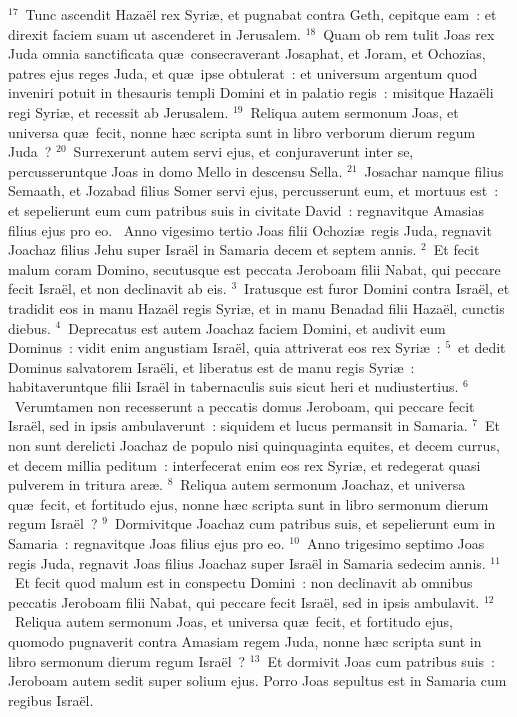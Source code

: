 ${}^{17}$~Tunc ascendit Haza\"el rex Syri\ae , et pugnabat contra Geth, cepitque eam~: et direxit faciem suam ut ascenderet in Jerusalem.
${}^{18}$~Quam ob rem tulit Joas rex Juda omnia sanctificata qu\ae\ consecraverant Josaphat, et Joram, et Ochozias, patres ejus reges Juda, et qu\ae\ ipse obtulerat~: et universum argentum quod inveniri potuit in thesauris templi Domini et in palatio regis~: misitque Haza\"eli regi Syri\ae , et recessit ab Jerusalem.
${}^{19}$~Reliqua autem sermonum Joas, et universa qu\ae\ fecit, nonne h\ae c scripta sunt in libro verborum dierum regum Juda~?
${}^{20}$~Surrexerunt autem servi ejus, et conjuraverunt inter se, percusseruntque Joas in domo Mello in descensu Sella.
${}^{21}$~Josachar namque filius Semaath, et Jozabad filius Somer servi ejus, percusserunt eum, et mortuus est~: et sepelierunt eum cum patribus suis in civitate David~: regnavitque Amasias filius ejus pro eo.
~\lettrine[lines=10,image=true,loversize=0.05,lraise=-0.03]{A}{}nno vigesimo tertio Joas filii Ochozi\ae\ regis Juda, regnavit Joachaz filius Jehu super Isra\"el in Samaria decem et septem annis.
${}^{2}$~Et fecit malum coram Domino, secutusque est peccata Jeroboam filii Nabat, qui peccare fecit Isra\"el, et non declinavit ab eis.
${}^{3}$~Iratusque est furor Domini contra Isra\"el, et tradidit eos in manu Haza\"el regis Syri\ae , et in manu Benadad filii Haza\"el, cunctis diebus.
${}^{4}$~Deprecatus est autem Joachaz faciem Domini, et audivit eum Dominus~: vidit enim angustiam Isra\"el, quia attriverat eos rex Syri\ae~:
${}^{5}$~et dedit Dominus salvatorem Isra\"eli, et liberatus est de manu regis Syri\ae~: habitaveruntque filii Isra\"el in tabernaculis suis sicut heri et nudiustertius.
${}^{6}$~Verumtamen non recesserunt a peccatis domus Jeroboam, qui peccare fecit Isra\"el, sed in ipsis ambulaverunt~: siquidem et lucus permansit in Samaria.
${}^{7}$~Et non sunt derelicti Joachaz de populo nisi quinquaginta equites, et decem currus, et decem millia peditum~: interfecerat enim eos rex Syri\ae , et redegerat quasi pulverem in tritura are\ae .
${}^{8}$~Reliqua autem sermonum Joachaz, et universa qu\ae\ fecit, et fortitudo ejus, nonne h\ae c scripta sunt in libro sermonum dierum regum Isra\"el~?
${}^{9}$~Dormivitque Joachaz cum patribus suis, et sepelierunt eum in Samaria~: regnavitque Joas filius ejus pro eo.
${}^{10}$~Anno trigesimo septimo Joas regis Juda, regnavit Joas filius Joachaz super Isra\"el in Samaria sedecim annis.
${}^{11}$~Et fecit quod malum est in conspectu Domini~: non declinavit ab omnibus peccatis Jeroboam filii Nabat, qui peccare fecit Isra\"el, sed in ipsis ambulavit.
${}^{12}$~Reliqua autem sermonum Joas, et universa qu\ae\ fecit, et fortitudo ejus, quomodo pugnaverit contra Amasiam regem Juda, nonne h\ae c scripta sunt in libro sermonum dierum regum Isra\"el~?
${}^{13}$~Et dormivit Joas cum patribus suis~: Jeroboam autem sedit super solium ejus. Porro Joas sepultus est in Samaria cum regibus Isra\"el.


